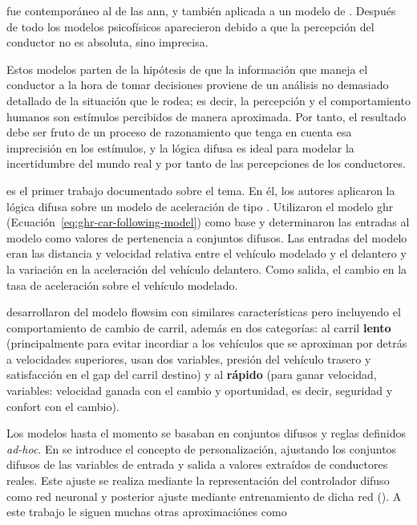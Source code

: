  fue contemporáneo al de las \gls{ann}, y también aplicada a un modelo de \textit{}. Después de todo los modelos psicofísicos aparecieron debido a que la percepción del conductor no es absoluta, sino imprecisa.

Estos modelos parten de la hipótesis de que la información que maneja el conductor a la hora de tomar decisiones proviene de un análisis no demasiado detallado de la situación que le rodea; es decir, la percepción y el comportamiento humanos son estímulos percibidos de manera aproximada. Por tanto, el resultado debe ser fruto de un proceso de razonamiento que tenga en cuenta esa imprecisión en los estímulos, y la lógica difusa es ideal para modelar la incertidumbre del mundo real y por tanto de las percepciones de los conductores.

\cite{Kikuchi1992} es el primer trabajo documentado sobre el tema. En él, los autores aplicaron la lógica difusa sobre un modelo de aceleración de tipo \textit{}. Utilizaron el modelo \gls{ghr} (Ecuación~\ref{eq:ghr-car-following-model}) como base y determinaron las entradas al modelo como valores de pertenencia a conjuntos difusos. Las entradas del modelo eran las distancia y velocidad relativa entre el vehículo modelado y el delantero y la variación en la aceleración del vehículo delantero. Como salida, el cambio en la tasa de aceleración sobre el vehículo modelado.

\cite{McDonald1997, Wu2003} desarrollaron del modelo \gls{flowsim} con similares características pero incluyendo el comportamiento de cambio de carril, además en dos categorías: al carril \textbf{lento} (principalmente para evitar incordiar a los vehículos que se aproximan por detrás a velocidades superiores, usan dos variables, presión del vehículo trasero y satisfacción en el gap del carril destino) y al \textbf{rápido} (para ganar velocidad, variables: velocidad ganada con el cambio y oportunidad, es decir, seguridad y confort con el cambio).

Los modelos hasta el momento se basaban en conjuntos difusos y reglas definidos \textit{ad-hoc}. En \cite{Chakroborty2003} se introduce el concepto de personalización, ajustando los conjuntos difusos de las variables de entrada y salida a valores extraídos de conductores reales. Este ajuste se realiza mediante la representación del controlador difuso como red neuronal y posterior ajuste mediante entrenamiento de dicha red (\textit{}). A este trabajo le siguen muchas otras aproximaciónes \textit{} como \cite{Ma2004, Zheng2005}

